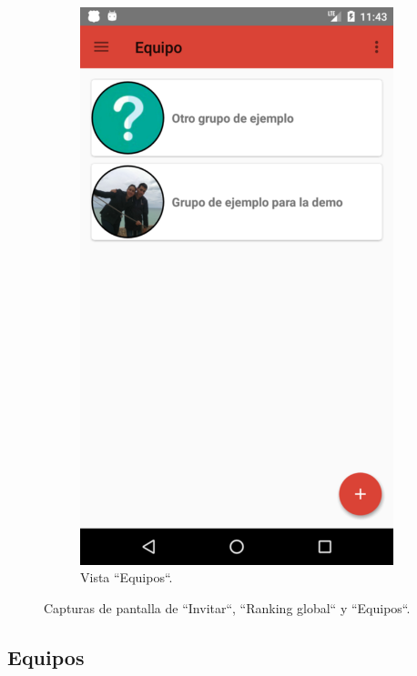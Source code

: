 \documentclass[twoside]{report}
\begin{document}
\begin{figure}[H]
\begin{center}
\begin{subfigure}[t]{.3\linewidth}
		\includegraphics[scale=0.2]{images/userguide/13.png}
		\caption{Vista “Equipos“.}
	\end{subfigure}\hspace{2mm}%
\caption{Capturas de pantalla de “Invitar“, “Ranking global“ y “Equipos“.}
\end{center}
\end{figure}

\subsection{Equipos}
\end{document}
